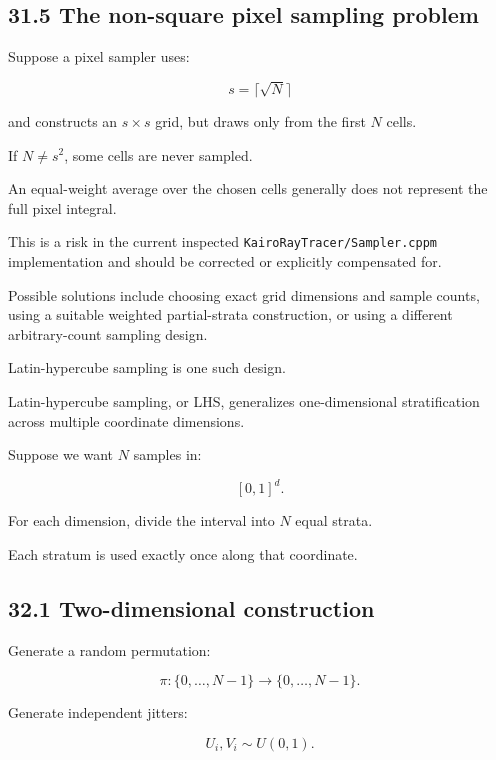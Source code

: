 \subsection{31.5 The non-square pixel sampling problem}\label{02-foundations-ii-ch031-the-non-square-pixel-sampling-problem}

\hypertarget{02-foundations-ii-ch031-the-non-square-pixel-sampling-problem}{}

Suppose a pixel sampler uses:

\[ s=\lceil\sqrt N\rceil \]

and constructs an \(s\times s\) grid, but draws only from the first \(N\) cells.

If \(N\ne s^2\), some cells are never sampled.

An equal-weight average over the chosen cells generally does not represent the full pixel integral.

This is a risk in the current inspected \texttt{KairoRayTracer/Sampler.cppm} implementation and should be corrected or explicitly compensated for.

Possible solutions include choosing exact grid dimensions and sample counts, using a suitable weighted partial-strata construction, or using a different arbitrary-count sampling design.

Latin-hypercube sampling is one such design.

Latin-hypercube sampling, or LHS, generalizes one-dimensional stratification across multiple coordinate dimensions.

Suppose we want \(N\) samples in:

\[ [0,1]^d. \]

For each dimension, divide the interval into \(N\) equal strata.

Each stratum is used exactly once along that coordinate.

\subsection{32.1 Two-dimensional construction}\label{02-foundations-ii-ch031-two-dimensional-construction}

\hypertarget{02-foundations-ii-ch031-two-dimensional-construction}{}

Generate a random permutation:

\[ \pi:\{0,\ldots,N-1\}\rightarrow\{0,\ldots,N-1\}. \]

Generate independent jitters:

\[ U_i,V_i\sim U(0,1). \]

